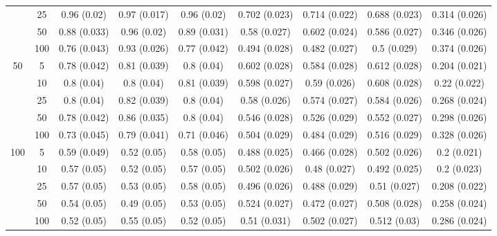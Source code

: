 \documentclass[10pt]{article}
\theoremstyle{definition}
\begin{document}
\begin{sidewaysfigure}
\begin{tabular}{cc|ccc|cccc}
    & 25 & 0.96 (0.02) & 0.97 (0.017) & 0.96 (0.02) & 0.702 (0.023) & 0.714 (0.022) & 0.688 (0.023) & 0.314 (0.026) \\ 
    & 50 & 0.88 (0.033) & 0.96 (0.02) & 0.89 (0.031) & 0.58 (0.027) & 0.602 (0.024) & 0.586 (0.027) & 0.346 (0.026) \\ 
    & 100 & 0.76 (0.043) & 0.93 (0.026) & 0.77 (0.042) & 0.494 (0.028) & 0.482 (0.027) & 0.5 (0.029) & 0.374 (0.026) \\ 
   \multirow{5}{*}{50} & 5 & 0.78 (0.042) & 0.81 (0.039) & 0.8 (0.04) & 0.602 (0.028) & 0.584 (0.028) & 0.612 (0.028) & 0.204 (0.021) \\ 
    & 10 & 0.8 (0.04) & 0.8 (0.04) & 0.81 (0.039) & 0.598 (0.027) & 0.59 (0.026) & 0.608 (0.028) & 0.22 (0.022) \\ 
    & 25 & 0.8 (0.04) & 0.82 (0.039) & 0.8 (0.04) & 0.58 (0.026) & 0.574 (0.027) & 0.584 (0.026) & 0.268 (0.024) \\ 
    & 50 & 0.78 (0.042) & 0.86 (0.035) & 0.8 (0.04) & 0.546 (0.028) & 0.526 (0.029) & 0.552 (0.027) & 0.298 (0.026) \\ 
    & 100 & 0.73 (0.045) & 0.79 (0.041) & 0.71 (0.046) & 0.504 (0.029) & 0.484 (0.029) & 0.516 (0.029) & 0.328 (0.026) \\ 
   \multirow{5}{*}{100} & 5 & 0.59 (0.049) & 0.52 (0.05) & 0.58 (0.05) & 0.488 (0.025) & 0.466 (0.028) & 0.502 (0.026) & 0.2 (0.021) \\ 
    & 10 & 0.57 (0.05) & 0.52 (0.05) & 0.57 (0.05) & 0.502 (0.026) & 0.48 (0.027) & 0.492 (0.025) & 0.2 (0.023) \\ 
    & 25 & 0.57 (0.05) & 0.53 (0.05) & 0.58 (0.05) & 0.496 (0.026) & 0.488 (0.029) & 0.51 (0.027) & 0.208 (0.022) \\ 
    & 50 & 0.54 (0.05) & 0.49 (0.05) & 0.53 (0.05) & 0.524 (0.027) & 0.472 (0.027) & 0.508 (0.028) & 0.258 (0.024) \\ 
    & 100 & 0.52 (0.05) & 0.55 (0.05) & 0.52 (0.05) & 0.51 (0.031) & 0.502 (0.027) & 0.512 (0.03) & 0.286 (0.024) \\ 
\end{tabular}
\end{sidewaysfigure}

\end{document}
